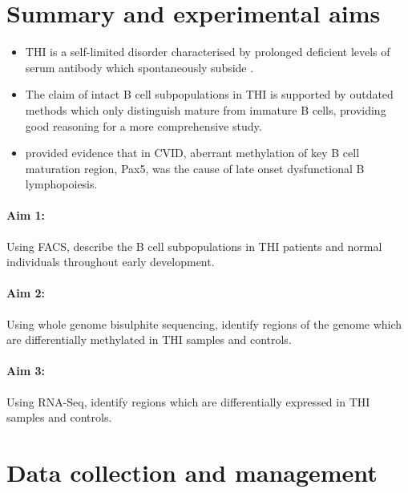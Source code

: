 \documentclass[12pt]{article}
\begin{document}
	\section{Summary and experimental aims}

		\begin{mybox}
			
			\begin{itemize}

				\item THI is a self-limited disorder characterised by prolonged deficient levels of serum antibody which spontaneously subside \citep{Tiller78,Soothill68,Siegel81,McGeady87,Dressler89,Kowalczyk97,Dalal98,AlHerz14,Gitlin56,AlHerz11,Rosen66,Stiemh80,Buckley83}.
				\item The claim of intact B cell subpopulations in THI is supported by outdated methods which only distinguish mature from immature B cells, providing good reasoning for a more comprehensive study.
				\item \citet{Tallmadge15} provided evidence that in CVID, aberrant methylation of key B cell maturation region, Pax5, was the cause of late onset dysfunctional B lymphopoiesis.
				
			\end{itemize}

		\end{mybox}
		
			\paragraph{Aim 1:} Using FACS, describe the B cell subpopulations in THI patients and normal individuals throughout early development.
			
			\paragraph{Aim 2:} Using whole genome bisulphite sequencing, identify regions of the genome which are differentially methylated in THI samples and controls.
			
			\paragraph{Aim 3:} Using RNA-Seq, identify regions which are differentially expressed in THI samples and controls.

	\section{Data collection and management}
	
\end{document}
